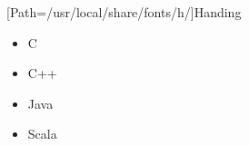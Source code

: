\documentclass[cn,chinesetitle=simpletitle,10pt,a4paper]{justresume}
\author{随机}
\begin{document}
[Path=/usr/local/share/fonts/h/]{Handing}
\renewcommand{\chtitle}{\CJKfamily{tm}}

\maketitle




\zhlipsum[1]


\zhlipsum[2]


\zhlipsum[3]


\zhlipsum[4]

\begin{itemize}[label={\(\circ\)}]
    \item C
    \item C++
    \item Java 
    \item Scala
\end{itemize}
\end{document}
